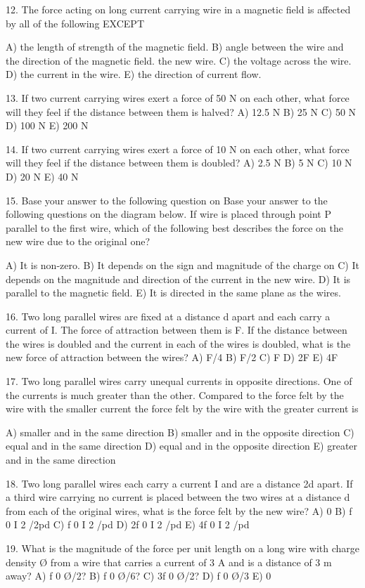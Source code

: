 12. The force acting on long current carrying wire in a
magnetic field is affected by all of the following EXCEPT

A) the length of strength of the magnetic field.
B) angle between the wire and the direction of the magnetic field.  the new wire.
C) the voltage across the wire.
D) the current in the wire.
E) the direction of current flow.


13. If two current carrying wires exert a force of 50 N on each
other, what force will they feel if the distance between them
is halved?
A) 12.5 N
B) 25 N
C) 50 N
D) 100 N
E) 200 N


14. If two current carrying wires exert a force of 10 N on each
other, what force will they feel if the distance between them
is doubled?
A) 2.5 N
B) 5 N
C) 10 N
D) 20 N
E) 40 N


15. Base your answer to the following question on Base your
answer to the following questions on the diagram below.
If wire is placed through point P parallel to the first wire,
which of the following best describes the force on the new
wire due to the original one?

A) It is non-zero.
B) It depends on the sign and magnitude of the charge on
C) It depends on the magnitude and direction of the current in the new wire.
D) It is parallel to the magnetic field.
E) It is directed in the same plane as the wires.



16. Two long parallel wires are fixed at a distance d apart and
each carry a current of I. The force of attraction between
them is F. If the distance between the wires is doubled and
the current in each of the wires is doubled, what is the new
force of attraction between the wires?
A) F/4
B) F/2
C) F
D) 2F
E) 4F


17. Two long parallel wires carry unequal currents in opposite
directions. One of the currents is much greater than the
other. Compared to the force felt by the wire with the
smaller current the force felt by the wire with the greater
current is

A) smaller and in the same direction
B) smaller and in the opposite direction
C) equal and in the same direction
D) equal and in the opposite direction
E) greater and in the same direction


18. Two long parallel wires each carry a current I and are a
distance 2d apart. If a third wire carrying no current is
placed between the two wires at a distance d from each of
the original wires, what is the force felt by the new wire?
A) 0
B) ƒ 0 I 2 /2pd
C) ƒ 0 I 2 /pd
D) 2ƒ 0 I 2 /pd
E) 4ƒ 0 I 2 /pd


19. What is the magnitude of the force per unit length on a long
wire with charge density Ø from a wire that carries a current
of 3 A and is a distance of 3 m away?
A) ƒ 0 Ø/2?
B) ƒ 0 Ø/6?
C) 3ƒ 0 Ø/2?
D) ƒ 0 Ø/3
E) 0




\endinput


